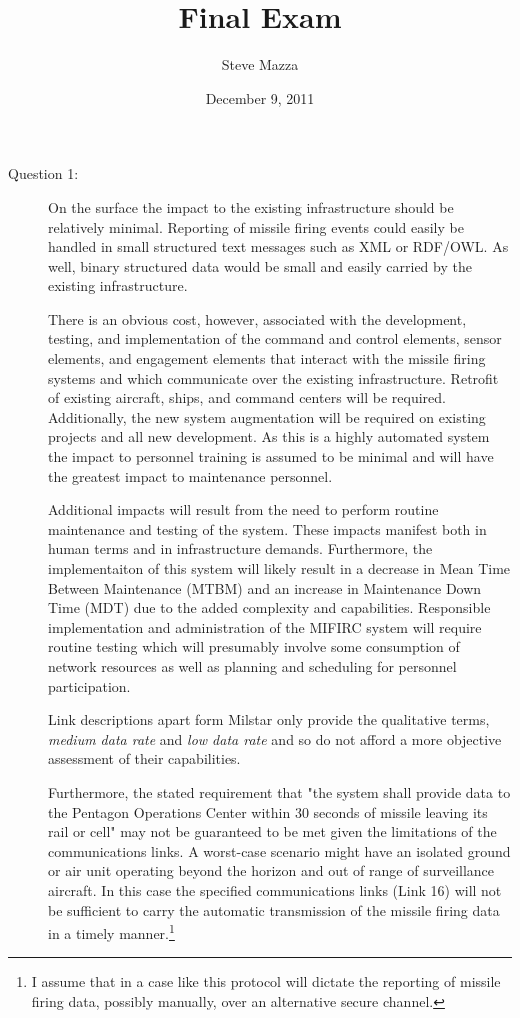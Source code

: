\documentclass[letterpaper,10pt]{article}
\title{Final Exam}
\author{Steve Mazza}
\date{December 9, 2011}
\begin{document}
\maketitle

\begin{description}
\item[Question 1:] On the surface the impact to the existing infrastructure should be relatively minimal.  Reporting of missile firing events could easily be handled in small structured text messages such as XML or RDF/OWL.  As well, binary structured data would be small and easily carried by the existing infrastructure.

There is an obvious cost, however, associated with the development, testing, and implementation of the command and control elements, sensor elements, and engagement elements that interact with the missile firing systems and which communicate over the existing infrastructure.  Retrofit of existing aircraft, ships, and command centers will be required.  Additionally, the new system augmentation will be required on existing projects and all new development.  As this is a highly automated system the impact to personnel training is assumed to be minimal and will have the greatest impact to maintenance personnel.

Additional impacts will result from the need to perform routine maintenance and testing of the system.  These impacts manifest both in human terms and in infrastructure demands.  Furthermore, the implementaiton of this system will likely result in a decrease in Mean Time Between Maintenance (MTBM) and an increase in Maintenance Down Time (MDT) due to the added complexity and capabilities.  Responsible implementation and administration of the MIFIRC system will require routine testing which will presumably involve some consumption of network resources as well as planning and scheduling for personnel participation.

Link descriptions apart form Milstar only provide the qualitative terms, \emph{medium data rate} and \emph{low data rate} and so do not afford a more objective assessment of their capabilities.

Furthermore, the stated requirement that "the system shall provide data to the Pentagon Operations Center within 30 seconds of missile leaving its rail or cell" may not be guaranteed to be met given the limitations of the communications links.  A worst-case scenario might have an isolated ground or air unit operating beyond the horizon and out of range of surveillance aircraft.  In this case the specified communications links (Link 16) will not be sufficient to carry the automatic transmission of the missile firing data in a timely manner.\footnote{I assume that in a case like this protocol will dictate the reporting of missile firing data, possibly manually, over an alternative secure channel.}


\end{description}
\end{document}
